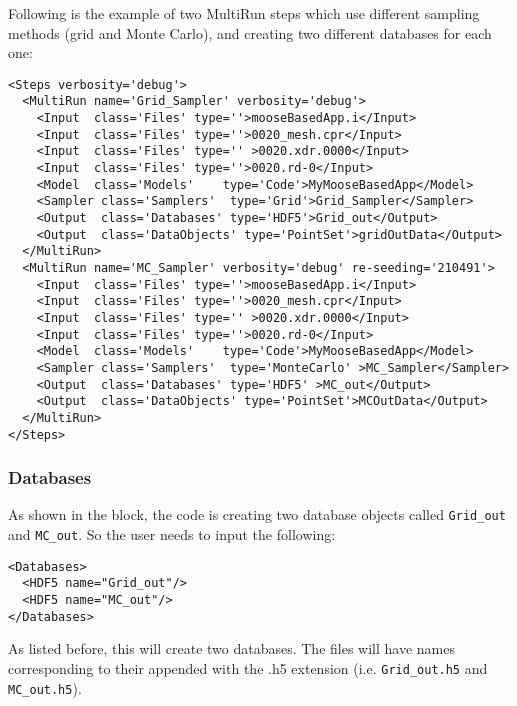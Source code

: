Following is the example of two MultiRun steps which use different sampling
methods (grid and Monte Carlo), and creating two different databases for each
one:
\begin{lstlisting}[style=XML]
<Steps verbosity='debug'>
  <MultiRun name='Grid_Sampler' verbosity='debug'>
    <Input  class='Files' type=''>mooseBasedApp.i</Input>
    <Input  class='Files' type=''>0020_mesh.cpr</Input>
    <Input  class='Files' type='' >0020.xdr.0000</Input>
    <Input  class='Files' type=''>0020.rd-0</Input>
    <Model  class='Models'    type='Code'>MyMooseBasedApp</Model>
    <Sampler class='Samplers'  type='Grid'>Grid_Sampler</Sampler>
    <Output  class='Databases' type='HDF5'>Grid_out</Output>
    <Output  class='DataObjects' type='PointSet'>gridOutData</Output>
  </MultiRun>
  <MultiRun name='MC_Sampler' verbosity='debug' re-seeding='210491'>
    <Input  class='Files' type=''>mooseBasedApp.i</Input>
    <Input  class='Files' type=''>0020_mesh.cpr</Input>
    <Input  class='Files' type='' >0020.xdr.0000</Input>
    <Input  class='Files' type=''>0020.rd-0</Input>
    <Model  class='Models'    type='Code'>MyMooseBasedApp</Model>
    <Sampler class='Samplers'  type='MonteCarlo' >MC_Sampler</Sampler>
    <Output  class='Databases' type='HDF5' >MC_out</Output>
    <Output  class='DataObjects' type='PointSet'>MCOutData</Output>
  </MultiRun>
</Steps>
\end{lstlisting}
\subsubsection{Databases}
As shown in the  block, the code is creating two database objects
called \texttt{Grid\_out} and \texttt{MC\_out}.
%
So the user needs to input the following:
\begin{lstlisting}[style=XML]
<Databases>
  <HDF5 name="Grid_out"/>
  <HDF5 name="MC_out"/>
</Databases>
\end{lstlisting}
As listed before, this will create two databases.
%
The files will have names corresponding to their  appended with
the .h5 extension (i.e. \texttt{Grid\_out.h5} and \texttt{MC\_out.h5}).
